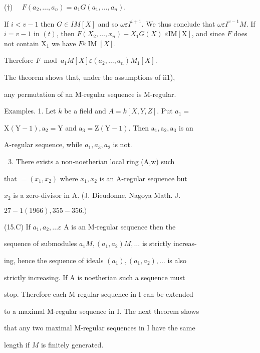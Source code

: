 (†) $\quad F\left(a_{2}, \ldots, a_{n}\right)=a_{1} G\left(a_{1}, \ldots, a_{n}\right)$.

If $i<v-1$ then $G \in I M[X]$ and so $\omega \varepsilon I^{i+1}$. We thus conclude that $\omega \varepsilon I^{v-1} M$. If $i=v-1$ in $(t)$, then $F\left(X_{2}, \ldots, x_{n}\right)-X_{1} G(X)$ $\varepsilon \mathrm{IM}[\mathrm{X}]$, and since $F$ does not contain $\mathrm{X}_{1}$ we have $F \varepsilon \operatorname{IM}[X]$.

Therefore $F \bmod a_{1} M[X] \varepsilon\left(a_{2}, \ldots, a_{n}\right) M_{1}[X]$.

The theorem shows that, under the assumptions of ii1),

any permutation of an M-regular sequence is M-regular.

Examples. 1. Let $k$ be a field and $A=k[X, Y, Z]$. Put $a_{1}=$

$\mathrm{X}(\mathrm{Y}-1), \mathrm{a}_{2}=\mathrm{Y}$ and $\mathrm{a}_{3}=\mathrm{Z}(\mathrm{Y}-1)$. Then $\mathrm{a}_{1}, \mathrm{a}_{2}, \mathrm{a}_{3}$ is an

A-regular sequence, while $a_{1}, a_{3}, a_{2}$ is not.

\begin{enumerate}
  \setcounter{enumi}{2}
  \item There exists a non-noetherian local ring (A,w) such
\end{enumerate}
that $=\left(x_{1}, x_{2}\right)$ where $x_{1}, x_{2}$ is an A-regular sequence but

$x_{2}$ is a zero-divisor in A. (J. Dieudonne, Nagoya Math. J.

$27-1(1966), 355-356 .)$

(15.C) If $a_{1}, a_{2}, \ldots \varepsilon$ A is an M-regular sequence then the

sequence of submodules $a_{1} M,\left(a_{1}, a_{2}\right) M, \ldots$ is strictly increas-

ing, hence the sequence of ideals $\left(a_{1}\right),\left(a_{1}, a_{2}\right), \ldots$ is also

strictly increasing. If A is noetherian such a sequence must

stop. Therefore each M-regular sequence in I can be extended

to a maximal M-regular sequence in I. The next theorem shows

that any two maximal M-regular sequences in I have the same

length if $M$ is finitely generated.

